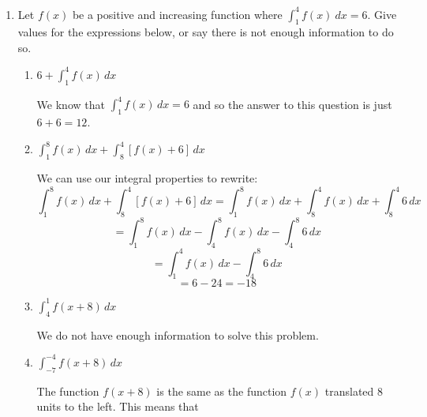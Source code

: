 \documentclass{article}
\begin{document}
\begin{enumerate}
\begin{enumerate}
\begin{solution}
\end{solution} 
   

   

    
  \end{enumerate}
   
   \probonly{\newpage}
   \item Let  $f(x)$ be a positive and increasing function where $\displaystyle\int_1^4 f(x)\ dx = 6$.  Give values for the expressions below, or say there is not enough information to do so. %
\begin{enumerate}
\item $6+\displaystyle\int_1^4f(x) \, dx$\vfill
\begin{solution} 
We know that $\displaystyle\int_1^4f(x) \, dx = 6$ and so the answer to this question is just $6 +6=12$. 

\end{solution} 
\item $\displaystyle\int_1^8 f(x) \, dx + \int_8^4 [f(x)+6] \, dx$\vfill
\begin{solution} 
We can use our integral properties to rewrite: 
$$\displaystyle\int_1^8 f(x) \, dx + \int_8^4 [f(x)+6] \, dx= \displaystyle\int_1^8 f(x) \, dx + \int_8^4 f(x)\, dx + \int_8^4 6 \, dx$$ 
$$= \displaystyle\int_1^8 f(x) \, dx - \int_4^8 f(x)\, dx - \int_4^8 6 \, dx $$
$$= \displaystyle\int_1^4 f(x) \, dx - \int_4^8 6 \, dx$$
$$ = 6 - 24 = -18$$ 


\end{solution} 

\item $\displaystyle\int_4^1 f(x+8)\, dx$

\begin{solution} 
We do not have enough information to solve this problem.

\end{solution} 

\vfill
\item $\displaystyle\int_{-7}^{-4} f(x+8)\, dx$

\begin{solution} 
The function $f(x+8)$ is the same as the function $f(x)$ translated 8 units to the left. This means that 


\end{solution}
\end{enumerate}
\end{enumerate}
\end{document}
